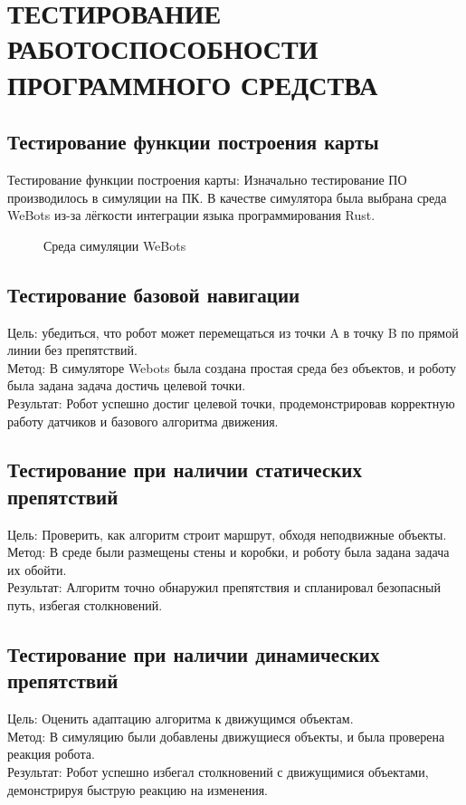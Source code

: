 \section{ТЕСТИРОВАНИЕ РАБОТОСПОСОБНОСТИ ПРОГРАММНОГО СРЕДСТВА}

\subsection{Тестирование функции построения карты}
Тестирование функции построения карты:
Изначально тестирование ПО производилось в симуляции на ПК. В качестве симулятора была выбрана среда WeBots
из-за лёгкости интеграции языка программирования Rust.


\begin{figure}[H]
\centering
\caption{Среда симуляции WeBots}
\label{fig:components}
\end{figure}


\subsection{Тестирование базовой навигации}
Цель: убедиться, что робот может перемещаться из точки A в точку B по прямой линии без препятствий. \\ {Метод}: В симуляторе Webots была создана простая среда без объектов, и роботу была задана задача достичь целевой точки. \\
{Результат}: Робот успешно достиг целевой точки, продемонстрировав корректную работу датчиков и базового алгоритма движения.

\subsection{Тестирование при наличии статических препятствий}
Цель: Проверить, как алгоритм строит маршрут, обходя неподвижные объекты. \\
{Метод}: В среде были размещены стены и коробки, и роботу была задана задача их обойти. \\
{Результат}: Алгоритм точно обнаружил препятствия и спланировал безопасный путь, избегая столкновений.

\subsection{Тестирование при наличии динамических препятствий}
Цель: Оценить адаптацию алгоритма к движущимся объектам. \\
Метод: В симуляцию были добавлены движущиеся объекты, и была проверена реакция робота. \\
Результат: Робот успешно избегал столкновений с движущимися объектами, демонстрируя быструю реакцию на изменения.

